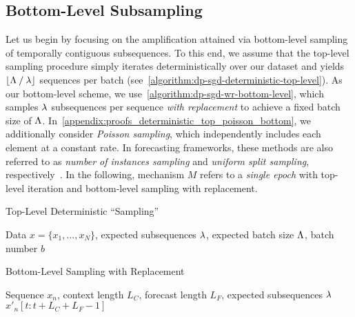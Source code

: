 \subsection{Bottom-Level Subsampling}\label{section:bottom_level_subsampling}
Let us begin by focusing on the amplification attained via bottom-level sampling of temporally contiguous subsequences. To this end, we assume that the top-level sampling procedure 
simply iterates deterministically over our dataset and yields $ \lfloor \Lambda \mathbin{/} \lambda  \rfloor$ sequences per batch (see~\cref{algorithm:dp-sgd-deterministic-top-level}).
As our bottom-level scheme, we use~\cref{algorithm:dp-sgd-wr-bottom-level}, which samples 
$\lambda$ subsequences per sequence \emph{with replacement} to achieve a fixed batch size of $\Lambda$.
In~\cref{appendix:proofs_deterministic_top_poisson_bottom}, we additionally consider \emph{Poisson sampling}, which independently includes each element at a constant rate. 
In forecasting frameworks, these methods are also referred to as \emph{number of instances sampling} and \emph{uniform split sampling}, respectively~\cite{alexandrov2019gluonts}.
In the following, mechanism $M$ refers to a \emph{single epoch} with top-level iteration and bottom-level sampling with replacement. 
\begin{algorithm}
   \caption{Top-Level Deterministic ``Sampling''}
   \label{algorithm:dp-sgd-deterministic-top-level}
\begin{algorithmic}
    Data $x = \{x_1, \dots, x_N\}$, expected subsequences $\lambda$, expected batch size $\Lambda$, batch number $b$
     \hfill {}
    \ENDFOR
\end{algorithmic}
\end{algorithm}

\begin{algorithm}
   \caption{Bottom-Level Sampling with Replacement}
   \label{algorithm:dp-sgd-wr-bottom-level}
\begin{algorithmic}
        Sequence $x_n$, context length $L_C$, forecast length $L_F$, expected subsequences $\lambda$
     \hfill {}
     \hfill {}
         $x'_n[t : t + L_C +  L_F - 1]$ \hfill {}
    \ENDFOR
\end{algorithmic}
\end{algorithm}


